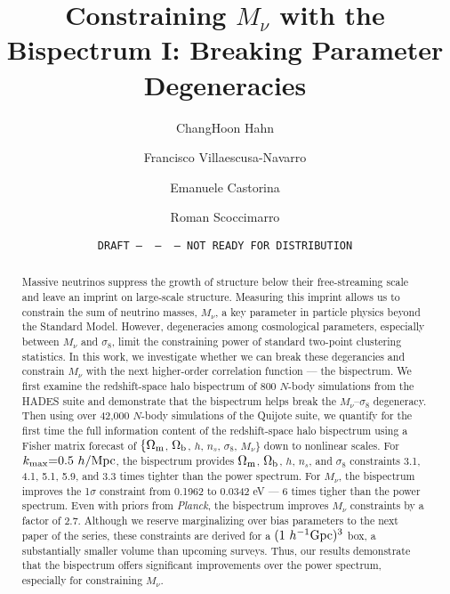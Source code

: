 \documentclass[12pt, letterpaper, preprint]{aastex62}
\newcommand{\Om}{\Omega_{\rm m}}
\newcommand{\Ob}{\Omega_{\rm b}}
\newcommand{\smnu}{M_\nu}
\newcommand{\sig}{\sigma_8}
\newcommand{\mpc}{h/{\rm Mpc}}
\begin{document}
\sloppy\sloppypar\frenchspacing 

\title{Constraining $\smnu$ with the Bispectrum I: Breaking Parameter Degeneracies} 
\date{\texttt{DRAFT~---~\githash~---~\gitdate~---~NOT READY FOR DISTRIBUTION}}

\author{ChangHoon Hahn}

\author{Francisco Villaescusa-Navarro} 

\author{Emanuele Castorina} 

\author{Roman Scoccimarro} 

\begin{abstract}
    Massive neutrinos suppress the growth of structure below their free-streaming scale and leave an 
    imprint on large-scale structure. Measuring this imprint allows us to constrain the sum of neutrino 
    masses, $\smnu$, a key parameter in particle physics beyond the Standard Model. However, degeneracies 
    among cosmological parameters, especially between $\smnu$ and $\sig$, limit the constraining power 
    of standard two-point clustering statistics. In this work, we investigate whether we can break these 
    degerancies and constrain $\smnu$ with the next higher-order correlation function --- the bispectrum. 
    We first examine the redshift-space halo bispectrum of $800$ $N$-body simulations from the HADES suite 
    and demonstrate that the bispectrum helps break the $\smnu$--$\sig$ degeneracy. Then using over 42,000
    $N$-body simulations of the Quijote suite, we quantify for the first time the full information content 
    of the redshift-space halo bispectrum using a Fisher matrix forecast of $\{\Om$, $\Ob$, $h$, $n_s$, $\sig$, $\smnu\}$ 
    down to nonlinear scales. For $k_{\rm max}{=}0.5~\mpc$, the bispectrum provides
    $\Om$, $\Ob$, $h$, $n_s$, and $\sig$ constraints 3.1, 4.1, 5.1, 5.9, and 3.3 times tighter than the 
    power spectrum. For $\smnu$, the bispectrum improves the 1$\sigma$ constraint from 
    0.1962 to 0.0342 eV --- 6 times tigher than the power spectrum. Even with priors from {\em Planck}, 
    the bispectrum improves $\smnu$ constraints by a factor of 2.7. Although we reserve marginalizing 
    over bias parameters to the next paper of the series, these constraints are derived for a 
    $(1~h^{-1}{\rm Gpc})^3$ box, a substantially smaller volume than upcoming surveys. Thus, our results 
    demonstrate that the bispectrum offers significant improvements over the power spectrum, especially 
    for constraining $\smnu$.  
\end{abstract}
\end{document}
